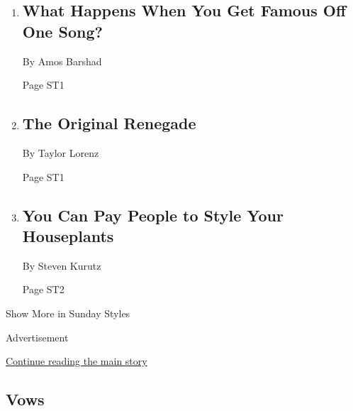 \begin{enumerate}
\def\labelenumi{\arabic{enumi}.}
\item
  \href{/2020/02/14/style/what-happens-when-you-get-famous-off-one-song.html}{}

  \hypertarget{what-happens-when-you-get-famous-off-one-song}{%
  \subsection{What Happens When You Get Famous Off One
  Song?}\label{what-happens-when-you-get-famous-off-one-song}}

  By Amos Barshad

  Page ST1
\item
  \href{/2020/02/13/style/the-original-renegade.html}{}

  \hypertarget{the-original-renegade}{%
  \subsection{The Original Renegade}\label{the-original-renegade}}

  By Taylor Lorenz

  Page ST1
\item
  \href{/2020/02/14/style/plant-stylists-unite.html}{}

  \hypertarget{you-can-pay-people-to-style-your-houseplants}{%
  \subsection{You Can Pay People to Style Your
  Houseplants}\label{you-can-pay-people-to-style-your-houseplants}}

  By Steven Kurutz

  Page ST2
\end{enumerate}

Show More in Sunday Styles

Advertisement

\protect\hyperlink{after-mid7}{Continue reading the main story}

\hypertarget{vows}{%
\subsection{Vows}\label{vows}}

